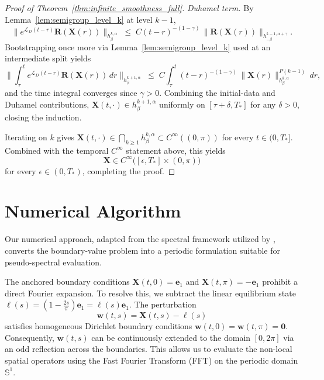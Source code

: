 \documentclass{amsart}
\begin{document}
\begin{proof}[Proof of Theorem~\ref{thm:infinite_smoothness_full}]
\emph{Duhamel term.} By Lemma~\ref{lem:semigroup_level_k} at level $k - 1$,
\[
\bigl\|e^{\mathcal{L}_D(t-r)}\mathbf{R}(\mathbf{X}(r))\bigr\|_{h^{k,\alpha}_\beta}
\;\le\; C(t-r)^{-(1-\gamma)}\,
\|\mathbf{R}(\mathbf{X}(r))\|_{h^{k-1,\alpha+\gamma}_{-\beta}}.
\]
Bootstrapping once more via Lemma~\ref{lem:semigroup_level_k} used at an intermediate split yields
\[
\biggl\| \int_\tau^t e^{\mathcal{L}_D(t-r)}\mathbf{R}(\mathbf{X}(r))\,dr
\biggr\|_{h^{k+1,\alpha}_\beta}
\;\le\; C\int_\tau^t (t-r)^{-(1-\gamma)}\,
\|\mathbf{X}(r)\|_{h^{k,\alpha}_\beta}^{P(k-1)}\,dr,
\]
and the time integral converges since $\gamma > 0$.  Combining the initial-data and Duhamel contributions, $\mathbf{X}(t, \cdot) \in h^{k+1,\alpha}_\beta$ uniformly on $[\tau + \delta, T_*]$ for any $\delta > 0$, closing the induction.

Iterating on $k$ gives $\mathbf{X}(t, \cdot) \in \bigcap_{k \ge 1} h^{k,\alpha}_\beta \subset C^\infty((0,\pi))$ for every $t \in (0, T_*]$. Combined with the temporal $C^\infty$ statement above, this yields
\[
\mathbf{X} \in C^\infty\bigl([\epsilon, T_*] \times (0,\pi)\bigr)
\]
for every $\epsilon \in (0, T_*)$, completing the proof.
\end{proof}


\section{Numerical Algorithm}
\label{s:numerics}
Our numerical approach, adapted from the spectral framework utilized by \cite{rodenberg20182d}, converts the boundary-value problem into a periodic formulation suitable for pseudo-spectral evaluation. 

The anchored boundary conditions $\mathbf{X}(t, 0) = \mathbf{e}_1$ and $\mathbf{X}(t, \pi) = -\mathbf{e}_1$ prohibit a direct Fourier expansion. To resolve this, we subtract the linear equilibrium state $\boldsymbol{\ell}(s) = \left( 1 - \frac{2s}{\pi} \right) \mathbf{e}_1 = \ell(s) \mathbf{e}_1$. The perturbation 
\begin{equation}
\mathbf{w}(t, s) = \mathbf{X}(t, s) - \boldsymbol{\ell}(s)
\end{equation}
satisfies homogeneous Dirichlet boundary conditions $\mathbf{w}(t, 0) = \mathbf{w}(t, \pi) = \mathbf{0}$. Consequently, $\mathbf{w}(t, s)$ can be continuously extended to the domain $[0, 2\pi]$ via an odd reflection across the boundaries. This allows us to evaluate the non-local spatial operators using the Fast Fourier Transform (FFT) on the periodic domain $\mathbb{S}^1$.
\end{document}
